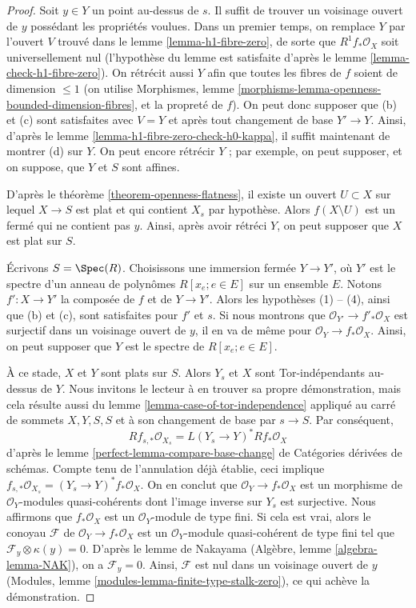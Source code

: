 \begin{proof}
Soit $y \in Y$ un point au-dessus de $s$.
Il suffit de trouver un voisinage ouvert de $y$
possédant les propriétés voulues. Dans un premier temps, on remplace $Y$
par l'ouvert $V$ trouvé dans le lemme \ref{lemma-h1-fibre-zero}, de sorte que
$R^1f_*\mathcal{O}_X$ soit universellement nul (l'hypothèse du
lemme est satisfaite d'après le lemme \ref{lemma-check-h1-fibre-zero}).
On rétrécit aussi $Y$ afin que toutes les fibres de $f$ soient de dimension $\leq 1$
(on utilise Morphismes, lemme
\ref{morphisms-lemma-openness-bounded-dimension-fibres},
et la propreté de $f$). On peut donc supposer que (b) et (c) sont satisfaites
avec $V = Y$ et après tout changement de base $Y' \to Y$.
Ainsi, d'après le lemme \ref{lemma-h1-fibre-zero-check-h0-kappa},
il suffit maintenant de montrer (d) sur $Y$.
On peut encore rétrécir $Y$ ; par exemple, on peut supposer, et on suppose,
que $Y$ et $S$ sont affines.

\medskip\noindent
D'après le théorème \ref{theorem-openness-flatness},
il existe un ouvert $U \subset X$ sur lequel $X \to S$
est plat et qui contient $X_s$ par hypothèse.
Alors $f(X \setminus U)$ est un fermé
qui ne contient pas $y$. Ainsi, après avoir rétréci $Y$,
on peut supposer que $X$ est plat sur $S$.

\medskip\noindent
Écrivons $S = \Spec(R)$. Choisissons une immersion fermée $Y \to Y'$, où $Y'$
est le spectre d'un anneau de polynômes $R[x_e; e \in E]$ sur un ensemble $E$.
Notons $f' : X \to Y'$ la composée de $f$ et de $Y \to Y'$.
Alors les hypothèses (1) -- (4), ainsi que (b) et (c),
sont satisfaites pour $f'$ et $s$. Si nous montrons que $\mathcal{O}_{Y'} \to f'_*\mathcal{O}_X$
est surjectif dans un voisinage ouvert de $y$, il en va de même pour
$\mathcal{O}_Y \to f_*\mathcal{O}_X$. Ainsi, on peut supposer que $Y$ est
le spectre de $R[x_e; e \in E]$.

\medskip\noindent
À ce stade, $X$ et $Y$ sont plats sur $S$. Alors $Y_s$ et $X$
sont Tor-indépendants au-dessus de $Y$. Nous invitons le lecteur à en trouver sa propre
démonstration, mais cela résulte aussi du
lemme \ref{lemma-case-of-tor-independence} appliqué au
carré de sommets $X, Y, S, S$ et à son changement de base par $s \to S$.
Par conséquent,
$$
Rf_{s, *}\mathcal{O}_{X_s} = L(Y_s \to Y)^*Rf_*\mathcal{O}_X
$$
d'après le lemme
\ref{perfect-lemma-compare-base-change} de Catégories dérivées de schémas.
Compte tenu de l'annulation déjà établie, ceci implique
$f_{s, *}\mathcal{O}_{X_s} = (Y_s \to Y)^*f_*\mathcal{O}_X$.
On en conclut que $\mathcal{O}_Y \to f_*\mathcal{O}_X$ est un morphisme de
$\mathcal{O}_Y$-modules quasi-cohérents dont l'image inverse
sur $Y_s$ est surjective. Nous affirmons que
$f_*\mathcal{O}_X$ est un $\mathcal{O}_Y$-module de type fini.
Si cela est vrai, alors le conoyau $\mathcal{F}$ de
$\mathcal{O}_Y \to f_*\mathcal{O}_X$
est un $\mathcal{O}_Y$-module quasi-cohérent de type fini
tel que $\mathcal{F}_y \otimes \kappa(y) = 0$.
D'après le lemme de Nakayama (Algèbre, lemme \ref{algebra-lemma-NAK}),
on a $\mathcal{F}_y = 0$. Ainsi, $\mathcal{F}$ est nul
dans un voisinage ouvert de $y$
(Modules, lemme \ref{modules-lemma-finite-type-stalk-zero}),
ce qui achève la démonstration.


\end{proof}
